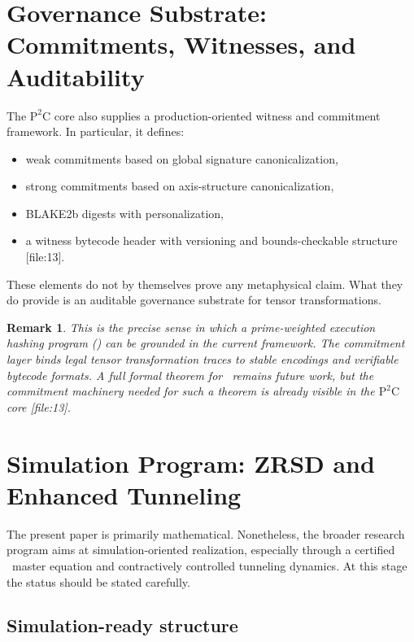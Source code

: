 \documentclass[11pt,a4paper]{article}
\newtheorem{remark}[theorem]{Remark}
\newcommand{\PWEH}{\mathrm{PWEH}}
\newcommand{\ZRSD}{\mathrm{ZRSD}}
\begin{document}
\section{Governance Substrate: Commitments, Witnesses, and Auditability}

The \(\mathrm{P}^2\mathrm{C}\) core also supplies a production-oriented witness and commitment framework. In particular, it defines:

\begin{itemize}[leftmargin=2em]
\item weak commitments based on global signature canonicalization,
\item strong commitments based on axis-structure canonicalization,
\item BLAKE2b digests with personalization,
\item a witness bytecode header with versioning and bounds-checkable structure [file:13].
\end{itemize}

These elements do not by themselves prove any metaphysical claim. What they do provide is an auditable governance substrate for tensor transformations.

\begin{remark}
This is the precise sense in which a prime-weighted execution hashing program (\PWEH) can be grounded in the current framework. The commitment layer binds legal tensor transformation traces to stable encodings and verifiable bytecode formats. A full formal theorem for \PWEH\ remains future work, but the commitment machinery needed for such a theorem is already visible in the \(\mathrm{P}^2\mathrm{C}\) core [file:13].
\end{remark}

\section{Simulation Program: ZRSD and Enhanced Tunneling}

The present paper is primarily mathematical. Nonetheless, the broader research program aims at simulation-oriented realization, especially through a certified \ZRSD\ master equation and contractively controlled tunneling dynamics. At this stage the status should be stated carefully.

\subsection{Simulation-ready structure}
\end{document}
